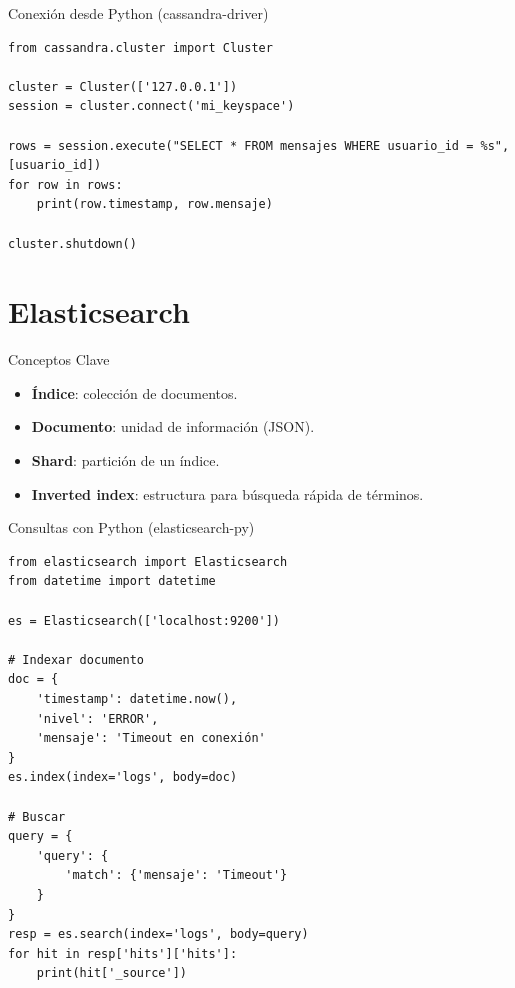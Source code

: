 \documentclass[aspectratio=169, 10pt, xcolor=table]{beamer}
\begin{document}
\begin{frame}[fragile]{Conexión desde Python (cassandra-driver)}
    \begin{lstlisting}[style=python]
from cassandra.cluster import Cluster

cluster = Cluster(['127.0.0.1'])
session = cluster.connect('mi_keyspace')

rows = session.execute("SELECT * FROM mensajes WHERE usuario_id = %s", [usuario_id])
for row in rows:
    print(row.timestamp, row.mensaje)

cluster.shutdown()
    \end{lstlisting}
\end{frame}

\section{Elasticsearch}

\begin{frame}{Conceptos Clave}
    \begin{itemize}
        \item \textbf{Índice}: colección de documentos.
        \item \textbf{Documento}: unidad de información (JSON).
        \item \textbf{Shard}: partición de un índice.
        \item \textbf{Inverted index}: estructura para búsqueda rápida de términos.
    \end{itemize}
\end{frame}

\begin{frame}[fragile]{Consultas con Python (elasticsearch-py)}
    \begin{lstlisting}[style=python]
from elasticsearch import Elasticsearch
from datetime import datetime

es = Elasticsearch(['localhost:9200'])

# Indexar documento
doc = {
    'timestamp': datetime.now(),
    'nivel': 'ERROR',
    'mensaje': 'Timeout en conexión'
}
es.index(index='logs', body=doc)

# Buscar
query = {
    'query': {
        'match': {'mensaje': 'Timeout'}
    }
}
resp = es.search(index='logs', body=query)
for hit in resp['hits']['hits']:
    print(hit['_source'])
    \end{lstlisting}
\end{frame}
\end{document}
